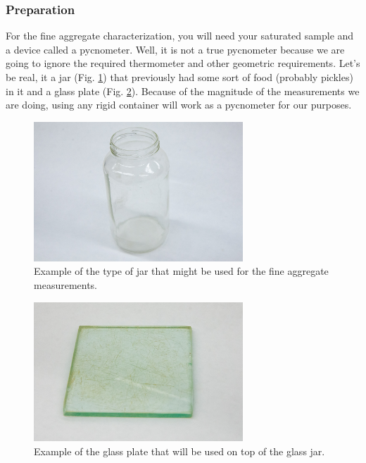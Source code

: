 \documentclass[12pt]{article}
\begin{document}
\subsubsection{Preparation}
For the fine aggregate characterization, you will need your saturated sample and a device called a pycnometer. Well, it is not a true pycnometer because we are going to ignore the required thermometer and other geometric requirements. Let's be real, it a jar (Fig. \ref{fig:jar}) that previously had some sort of food (probably pickles) in it and a glass plate (Fig. \ref{fig:glassplate}). Because of the magnitude of the measurements we are doing, using any rigid container will work as a pycnometer for our purposes.

\begin{figure}[H]
    \centering
    \includegraphics[width=0.7\textwidth]{GEO_5850.jpg}
    \caption{Example of the type of jar that might be used for the fine aggregate measurements.}
    \label{fig:jar}
\end{figure}

\begin{figure}[H]
    \centering
    \includegraphics[width=0.7\textwidth]{GEO_5847.jpg}
    \caption{Example of the glass plate that will be used on top of the glass jar.}
    \label{fig:glassplate}
\end{figure}
\end{document}
